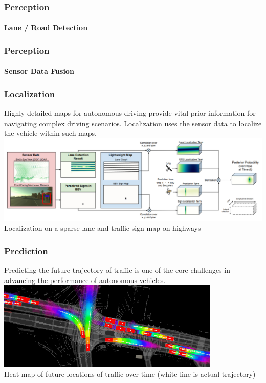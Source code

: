 \begin{frame}
\frametitle{Perception}
\framesubtitle{Lane / Road Detection}

\end{frame}

\begin{frame}
\frametitle{Perception}
\framesubtitle{Sensor Data Fusion}

\end{frame}

\begin{frame}
\frametitle{Localization}
Highly detailed maps for autonomous driving provide vital prior information
for navigating complex driving scenarios. Localization uses the sensor data
to localize the vehicle within such maps.\\
\vspace{0.25cm}
\centering
\includegraphics[width=\textwidth]{images/uber_sparse_localization.png}\\
\footnotesize{Localization on a sparse lane and traffic sign map on highways \cite{Ma2019}}
\end{frame}

\begin{frame}
\frametitle{Prediction}
Predicting the future trajectory of traffic is one of the core challenges in
advancing the performance of autonomous vehicles.\\
\vspace{0.25cm}
\centering
\includegraphics[width=0.8\textwidth]{images/uber_prediction.png}\\
\vspace{0.2cm}
\footnotesize{Heat map of future locations of traffic over time
      (white line is actual trajectory) \cite{Casas2020}}
\end{frame}

